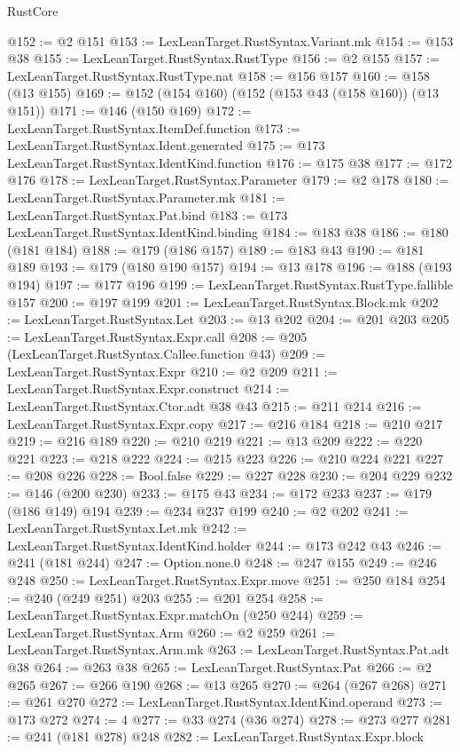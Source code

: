 \begin{lexlean}{RustCore}
\begin{coremodule}
@152 := @2 @151
@153 := LexLeanTarget.RustSyntax.Variant.mk
@154 := @153 @38
@155 := LexLeanTarget.RustSyntax.RustType
@156 := @2 @155
@157 := LexLeanTarget.RustSyntax.RustType.nat
@158 := @156 @157
@160 := @158 (@13 @155)
@169 := @152 (@154 @160) (@152 (@153 @43 (@158 @160)) (@13 @151))
@171 := @146 (@150 @169)
@172 := LexLeanTarget.RustSyntax.ItemDef.function
@173 := LexLeanTarget.RustSyntax.Ident.generated
@175 := @173 LexLeanTarget.RustSyntax.IdentKind.function
@176 := @175 @38
@177 := @172 @176
@178 := LexLeanTarget.RustSyntax.Parameter
@179 := @2 @178
@180 := LexLeanTarget.RustSyntax.Parameter.mk
@181 := LexLeanTarget.RustSyntax.Pat.bind
@183 := @173 LexLeanTarget.RustSyntax.IdentKind.binding
@184 := @183 @38
@186 := @180 (@181 @184)
@188 := @179 (@186 @157)
@189 := @183 @43
@190 := @181 @189
@193 := @179 (@180 @190 @157)
@194 := @13 @178
@196 := @188 (@193 @194)
@197 := @177 @196
@199 := LexLeanTarget.RustSyntax.RustType.fallible @157
@200 := @197 @199
@201 := LexLeanTarget.RustSyntax.Block.mk
@202 := LexLeanTarget.RustSyntax.Let
@203 := @13 @202
@204 := @201 @203
@205 := LexLeanTarget.RustSyntax.Expr.call
@208 := @205 (LexLeanTarget.RustSyntax.Callee.function @43)
@209 := LexLeanTarget.RustSyntax.Expr
@210 := @2 @209
@211 := LexLeanTarget.RustSyntax.Expr.construct
@214 := LexLeanTarget.RustSyntax.Ctor.adt @38 @43
@215 := @211 @214
@216 := LexLeanTarget.RustSyntax.Expr.copy
@217 := @216 @184
@218 := @210 @217
@219 := @216 @189
@220 := @210 @219
@221 := @13 @209
@222 := @220 @221
@223 := @218 @222
@224 := @215 @223
@226 := @210 @224 @221
@227 := @208 @226
@228 := Bool.false
@229 := @227 @228
@230 := @204 @229
@232 := @146 (@200 @230)
@233 := @175 @43
@234 := @172 @233
@237 := @179 (@186 @149) @194
@239 := @234 @237 @199
@240 := @2 @202
@241 := LexLeanTarget.RustSyntax.Let.mk
@242 := LexLeanTarget.RustSyntax.IdentKind.holder
@244 := @173 @242 @43
@246 := @241 (@181 @244)
@247 := Option.none.{0}
@248 := @247 @155
@249 := @246 @248
@250 := LexLeanTarget.RustSyntax.Expr.move
@251 := @250 @184
@254 := @240 (@249 @251) @203
@255 := @201 @254
@258 := LexLeanTarget.RustSyntax.Expr.matchOn (@250 @244)
@259 := LexLeanTarget.RustSyntax.Arm
@260 := @2 @259
@261 := LexLeanTarget.RustSyntax.Arm.mk
@263 := LexLeanTarget.RustSyntax.Pat.adt @38
@264 := @263 @38
@265 := LexLeanTarget.RustSyntax.Pat
@266 := @2 @265
@267 := @266 @190
@268 := @13 @265
@270 := @264 (@267 @268)
@271 := @261 @270
@272 := LexLeanTarget.RustSyntax.IdentKind.operand
@273 := @173 @272
@274 := 4
@277 := @33 @274 (@36 @274)
@278 := @273 @277
@281 := @241 (@181 @278) @248
@282 := LexLeanTarget.RustSyntax.Expr.block

\end{coremodule}
\end{lexlean}
